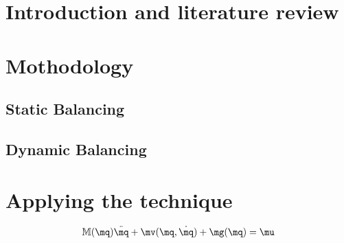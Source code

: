 \documentclass[a4paper,11pt,brazil,fleqn]{article}
\begin{document}




\section{Introduction and literature review}\label{S01}



\section{Mothodology}\label{S02}

\subsection{Static Balancing}\label{S02-1}

\subsection{Dynamic Balancing}\label{S02-2}



\section{Applying the technique}\label{S03}

\begin{equation}
\mM (\mq) \ddot{\mq} + \mv(\mq,\dot{\mq}) + \mg (\mq) = \mu
\end{equation}
\end{document}
